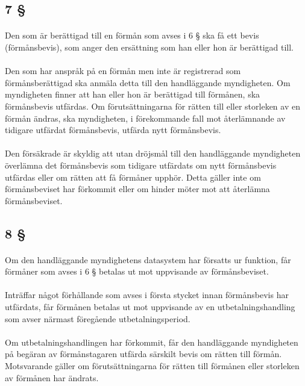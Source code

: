 \documentclass[a4paper,notitlepage,openany,10pt]{book}
\begin{document}
\subsection*{7 §}
\paragraph*{}
Den som är berättigad till en förmån som avses i 6 § ska få ett bevis (förmånsbevis), som anger den ersättning som han eller hon är berättigad till.
\paragraph*{}
Den som har anspråk på en förmån men inte är registrerad som förmånsberättigad ska anmäla detta till den handläggande myndigheten. Om myndigheten finner att han eller hon är berättigad till förmånen, ska förmånsbevis utfärdas. Om förutsättningarna för rätten till eller storleken av en förmån ändras, ska myndigheten, i förekommande fall mot återlämnande av tidigare utfärdat förmånsbevis, utfärda nytt förmånsbevis.
\paragraph*{}
Den försäkrade är skyldig att utan dröjsmål till den handläggande myndigheten överlämna det förmånsbevis som tidigare utfärdats om nytt förmånsbevis utfärdas eller om rätten att få förmåner upphör. Detta gäller inte om förmånsbeviset har förkommit eller om hinder möter mot att återlämna förmånsbeviset.
\subsection*{8 §}
\paragraph*{}
Om den handläggande myndighetens datasystem har försatts ur funktion, får förmåner som avses i 6 § betalas ut mot uppvisande av förmånsbeviset.
\paragraph*{}
Inträffar något förhållande som avses i första stycket innan förmånsbevis har utfärdats, får förmånen betalas ut mot uppvisande av en utbetalningshandling som avser närmast föregående utbetalningsperiod.
\paragraph*{}
Om utbetalningshandlingen har förkommit, får den handläggande myndigheten på begäran av förmånstagaren utfärda särskilt bevis om rätten till förmån. Motsvarande gäller om förutsättningarna för rätten till förmånen eller storleken av förmånen har ändrats.
\end{document}
